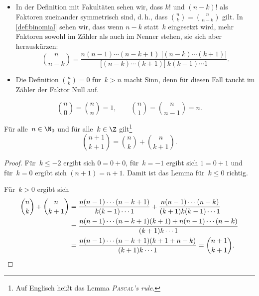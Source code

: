 \documentclass[a4paper]{article}
\begin{document}
\begin{remark}\leavevmode
    \begin{itemize}
        \item In der Definition mit Fakultäten sehen wir, dass $k!$ und $(n - k)!$ als Faktoren zueinander symmetrisch sind, d.\,h., dass $\binom{n}{k} = \binom{n}{n - k}$ gilt. In \cref{def:binomial} sehen wir, dass wenn $n - k$ statt~$k$ eingesetzt wird, mehr Faktoren sowohl im Zähler als auch im Nenner stehen, sie sich aber herauskürzen:
              \begin{equation*}
                  \binom{n}{n - k} = \frac{n (n - 1) \cdots (n - k + 1) \:\big[(n - k) \cdots (k + 1)\big]}{\big[(n - k) \cdots (k + 1)\big]\: k (k - 1) \cdots 1}.
              \end{equation*}
        \item Die Definition $\binom{n}{k} = 0$ für~$k > n$ macht Sinn, denn für diesen Fall taucht im Zähler der Faktor Null auf.
    \end{itemize}
\end{remark}

\begin{corollary}
    \begin{equation*}
        \binom{n}{0} = \binom{n}{n} = 1, \qquad \binom{n}{1} = \binom{n}{n - 1} = n.
    \end{equation*}
\end{corollary}

\begin{lemma}\label{lem:pascalsrule}
    Für alle~$n \in \N_0$ und für alle~$k \in \Z$ gilt\footnote{Auf Englisch heißt das Lemma \emph{\textsc{Pascal}'s rule}.}
    \begin{equation*}
        \binom{n + 1}{k + 1} = \binom{n}{k} + \binom{n}{k + 1}.
    \end{equation*}
\end{lemma}

\begin{proof}
    Für~$k \leq -2$ ergibt sich $0 = 0 + 0$, für~$k = -1$ ergibt sich $1 = 0 + 1$ und für~$k = 0$ ergibt sich $(n + 1) = n + 1$. Damit ist das Lemma für~$k \leq 0$ richtig.

    Für~$k > 0$ ergibt sich
    \begin{align*}
        \binom{n}{k} + \binom{n}{k + 1} & = \frac{n (n - 1) \cdots (n - k + 1)}{k (k - 1) \cdots 1} + \frac{n (n - 1) \cdots (n - k)}{(k + 1) k (k - 1) \cdots 1} \\
                                        & = \frac{n (n - 1) \cdots (n - k + 1) (k + 1) + n (n - 1) \cdots (n - k)}{(k + 1) k \cdots 1}                            \\
                                        & = \frac{n (n - 1) \cdots (n - k + 1) (k + 1 + n - k)}{(k + 1) k \cdots 1} = \binom{n + 1}{k + 1}. \qedhere
    \end{align*}
\end{proof}
\end{document}
